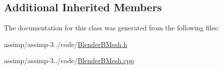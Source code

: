 \subsection*{Additional Inherited Members}


The documentation for this class was generated from the following files\+:\begin{DoxyCompactItemize}
\item 
assimp/assimp-\/3../code/\hyperlink{_blender_b_mesh_8h}{Blender\+B\+Mesh.\+h}\item 
assimp/assimp-\/3../code/\hyperlink{_blender_b_mesh_8cpp}{Blender\+B\+Mesh.\+cpp}\end{DoxyCompactItemize}
